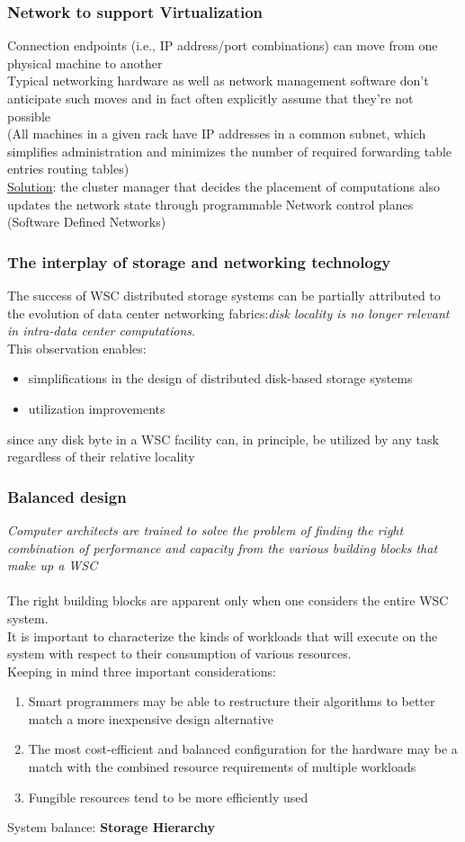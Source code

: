 \documentclass[10pt, oneside]{article}
\begin{document}
\subsubsection{Network to support Virtualization}
Connection endpoints (i.e., IP address/port combinations) can move from one physical machine to another\\ 
Typical networking hardware as well as network management software don’t anticipate such moves and in fact often explicitly assume that they’re not possible \\ (All machines in a given rack have IP addresses in a common subnet, which simplifies administration and minimizes the number of required forwarding table entries routing tables)\\ \underline{Solution}: the cluster manager that decides the placement of computations also updates the network state through programmable Network control planes (Software Defined Networks)
\subsubsection{The interplay of storage and networking technology}
The success of WSC distributed storage systems can be partially attributed to the evolution of data center networking fabrics:{\sl disk locality is no longer relevant in intra-data center computations}.\\
This observation enables:
\begin{itemize}
    \item simplifications in the design of distributed disk-based storage
    systems
    \item utilization improvements
\end{itemize}since any disk byte in a WSC facility can, in principle, be utilized by any task regardless of their relative locality
\subsubsection{Balanced design}
{\sl  Computer architects are trained to solve the problem of finding the right combination of performance and capacity from the various building blocks that make up a WSC}\\ \\
The right building blocks are apparent only when one considers the entire WSC system.\\
It is important to characterize the kinds of workloads that will execute on the system with respect to their consumption of various resources.\\
Keeping in mind three important considerations:
\begin{enumerate}
    \item Smart programmers may be able to restructure their algorithms to
    better match a more inexpensive design alternative
    \item The most cost-efficient and balanced configuration for the hardware may be a match with the combined resource requirements of multiple workloads
    \item Fungible resources tend to be more efficiently used
\end{enumerate}
System balance: {\bf Storage Hierarchy}
\end{document}
